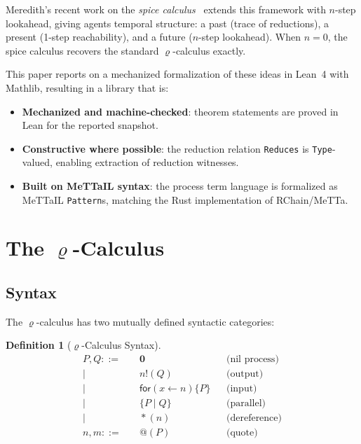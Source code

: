 \documentclass[11pt,a4paper]{article}
\makeatletter
\theoremstyle{definition}
\newtheorem{definition}[theorem]{Definition}
\theoremstyle{remark}
\renewcommand{\rho}{\varrho}
\newcommand{\pquote}[1]{@(#1)}
\newcommand{\pdrop}[1]{*(#1)}
\newcommand{\pout}[2]{#1\mathbin{!}(#2)}
\newcommand{\pin}[3]{\mathsf{for}(#1 \leftarrow #2)\{#3\}}
\newcommand{\ppar}[2]{\{#1 \mid #2\}}
\newcommand{\pnil}{\mathbf{0}}
\newcommand{\lean}[1]{\lstinline[language=Lean4]{#1}}
\makeatother
\begin{document}
Meredith's recent work on the \emph{spice calculus}~\cite{meredith2026spice}
extends this framework with $n$-step lookahead, giving agents temporal
structure: a past (trace of reductions), a present (1-step reachability),
and a future ($n$-step lookahead). When $n = 0$, the spice calculus recovers
the standard $\rho$-calculus exactly.

This paper reports on a mechanized formalization of these ideas in Lean~4
with Mathlib, resulting in a library that is:
\begin{itemize}[nosep]
  \item \textbf{Mechanized and machine-checked}: theorem statements are proved in Lean
    for the reported snapshot.
  \item \textbf{Constructive where possible}: the reduction relation \lean{Reduces}
    is \lean{Type}-valued, enabling extraction of reduction witnesses.
  \item \textbf{Built on MeTTaIL syntax}: the process term language is formalized
    as MeTTaIL \lean{Pattern}s, matching the Rust implementation of RChain/MeTTa.
\end{itemize}

\section{The $\rho$-Calculus}
\label{sec:rho}

\subsection{Syntax}

The $\rho$-calculus has two mutually defined syntactic categories:

\begin{definition}[$\rho$-Calculus Syntax]
\label{def:syntax}
\begin{align*}
  P, Q ::= &\quad \pnil                          && \text{(nil process)} \\
    \mid &\quad \pout{n}{Q}                       && \text{(output)} \\
    \mid &\quad \pin{x}{n}{P}                     && \text{(input)} \\
    \mid &\quad \ppar{P}{Q}                       && \text{(parallel)} \\
    \mid &\quad \pdrop{n}                          && \text{(dereference)} \\
  n, m ::= &\quad \pquote{P}                       && \text{(quote)}
\end{align*}
\end{definition}
\end{document}
